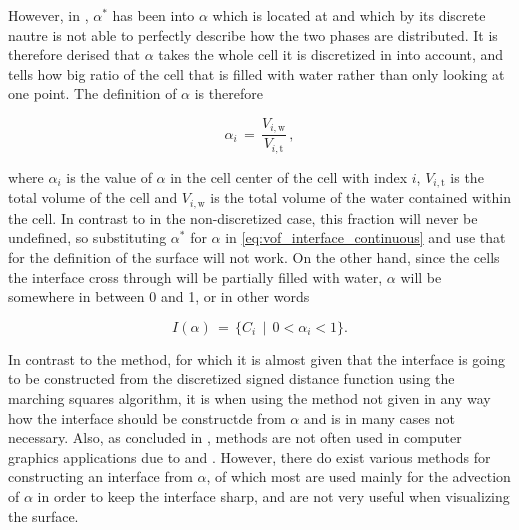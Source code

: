 However, in \thiswork, $\alpha^*$ has been \discretized into $\alpha$ which is located at  and which by its discrete nautre is not able to perfectly describe how the two phases are distributed. It is therefore derised that $\alpha$ takes the whole cell it is discretized in into account, and tells how big ratio of the cell that is filled with water rather than only looking at one point. The definition of $\alpha$ is therefore

\begin{equation} \label{eq:phase_fraction_discretized}
\alpha_i \,=\, \frac{V_{i,\text{w}}}{V_{i,\text{t}}}\,,
\end{equation}

where $\alpha_i$ is the value of $\alpha$ in the cell center of the cell with index $i$, $V_{i,\text{t}}$ is the total volume of the cell and $V_{i,\text{w}}$ is the total volume of the water contained within the cell. In contrast to in the non-discretized case, this fraction will never be undefined, so substituting $\alpha^*$ for $\alpha$ in \eqref{eq:vof_interface_continuous} and use that for the definition of the surface will not work. On the other hand, since the cells the interface cross through will be partially filled with water, $\alpha$ will be somewhere in between 0 and 1, or in other words

\begin{equation} \label{eq:vof_interface_discrete}
I(\alpha) \,=\, \{C_i \,\mid\, 0 < \alpha_i < 1\}.
\end{equation}


In contrast to the \LS method, for which it is almost given that the interface is going to be constructed from the discretized signed distance function using the marching squares algorithm, it is when using the \VOF method not given in any way how the interface should be constructde from $\alpha$ and is in many cases not necessary. Also, as concluded in \citep{Wojtan2009}, \VOF methods are not often used in computer graphics applications due to  and . However, there do exist various methods for constructing an interface from $\alpha$, of which most are used mainly for the advection of $\alpha$ in order to keep the interface sharp, and are not very useful when visualizing the surface.


